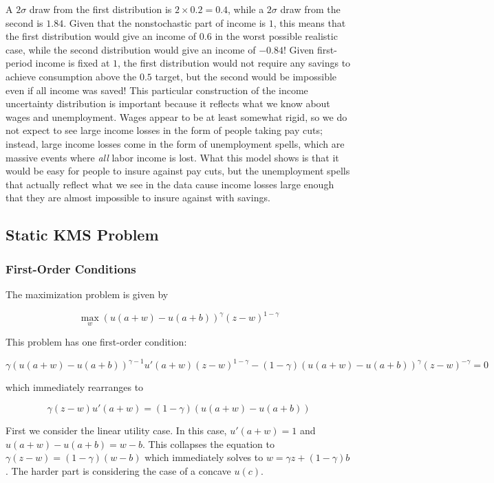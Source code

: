 \documentclass[12pt, letterpaper, parskip = full]{article}
\begin{document}
    A \(2\sigma\) draw from the first distribution is \(2 \times 0.2 = 0.4\), while a \(2\sigma\) draw from the second is \(1.84\). Given that the nonstochastic part of income is \(1\), this means that the first distribution would give an income of \(0.6\) in the worst possible realistic case, while the second distribution would give an income of \(-0.84\)! Given first-period income is fixed at \(1\), the first distribution would not require any savings to achieve consumption above the \(0.5\) target, but the second would be impossible even if all income was saved! This particular construction of the income uncertainty distribution is important because it reflects what we know about wages and unemployment. Wages appear to be at least somewhat rigid, so we do not expect to see large income losses in the form of people taking pay cuts; instead, large income losses come in the form of unemployment spells, which are massive events where \emph{all} labor income is lost. What this model shows is that it would be easy for people to insure against pay cuts, but the unemployment spells that actually reflect what we see in the data cause income losses large enough that they are almost impossible to insure against with savings.

    \subsection{Static KMS Problem}

    \subsubsection{First-Order Conditions}

    The maximization problem is given by

    \[ \max_{w} \left(u(a+w) - u(a+b)\right)^{\gamma} \left(z - w\right)^{1-\gamma}  \]

    This problem has one first-order condition:

    \[ \gamma (u(a+w) - u(a+b))^{\gamma - 1} u'(a+w) (z-w)^{1 - \gamma} - (1 - \gamma) (u(a+w) - u(a+b))^\gamma (z - w)^{-\gamma} = 0     \]

    which immediately rearranges to

    \[ \gamma (z - w) u'(a+w) = (1 - \gamma) (u(a+w) - u(a + b))   \]

    First we consider the linear utility case. In this case, \(u'(a+w) = 1\) and \(u(a+w) - u(a+b) = w - b\). This collapses the equation to \(\gamma (z - w) = (1 - \gamma) (w - b)\) which immediately solves to \(w = \gamma z + (1 - \gamma) b\). The harder part is considering the case of a concave \(u(c)\). 
\end{document}
